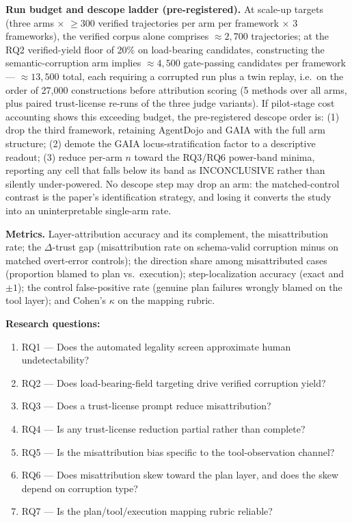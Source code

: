 \documentclass[11pt]{article}
\begin{document}
\textbf{Run budget and descope ladder (pre-registered).} At scale-up targets (three arms $\times$ $\geq 300$ verified trajectories per arm per framework $\times$ 3 frameworks), the verified corpus alone comprises ${\approx}2{,}700$ trajectories; at the RQ2 verified-yield floor of 20\% on load-bearing candidates, constructing the semantic-corruption arm implies ${\approx}4{,}500$ gate-passing candidates per framework --- ${\approx}13{,}500$ total, each requiring a corrupted run plus a twin replay, i.e.\ on the order of 27{,}000 constructions before attribution scoring (5 methods over all arms, plus paired trust-license re-runs of the three judge variants). If pilot-stage cost accounting shows this exceeding budget, the pre-registered descope order is: (1) drop the third framework, retaining AgentDojo and GAIA with the full arm structure; (2) demote the GAIA locus-stratification factor to a descriptive readout; (3) reduce per-arm $n$ toward the RQ3/RQ6 power-band minima, reporting any cell that falls below its band as INCONCLUSIVE rather than silently under-powered. No descope step may drop an arm: the matched-control contrast is the paper's identification strategy, and losing it converts the study into an uninterpretable single-arm rate.

\textbf{Metrics.} Layer-attribution accuracy and its complement, the misattribution rate; the $\Delta$-trust gap (misattribution rate on schema-valid corruption minus on matched overt-error controls); the direction share among misattributed cases (proportion blamed to plan vs.\ execution); step-localization accuracy (exact and $\pm 1$); the control false-positive rate (genuine plan failures wrongly blamed on the tool layer); and Cohen's $\kappa$ on the mapping rubric.

\textbf{Research questions:}
\begin{enumerate}[leftmargin=1.6em]
\item RQ1 --- Does the automated legality screen approximate human undetectability?
\item RQ2 --- Does load-bearing-field targeting drive verified corruption yield?
\item RQ3 --- Does a trust-license prompt reduce misattribution?
\item RQ4 --- Is any trust-license reduction partial rather than complete?
\item RQ5 --- Is the misattribution bias specific to the tool-observation channel?
\item RQ6 --- Does misattribution skew toward the plan layer, and does the skew depend on corruption type?
\item RQ7 --- Is the plan/tool/execution mapping rubric reliable?
\end{enumerate}
\end{document}
